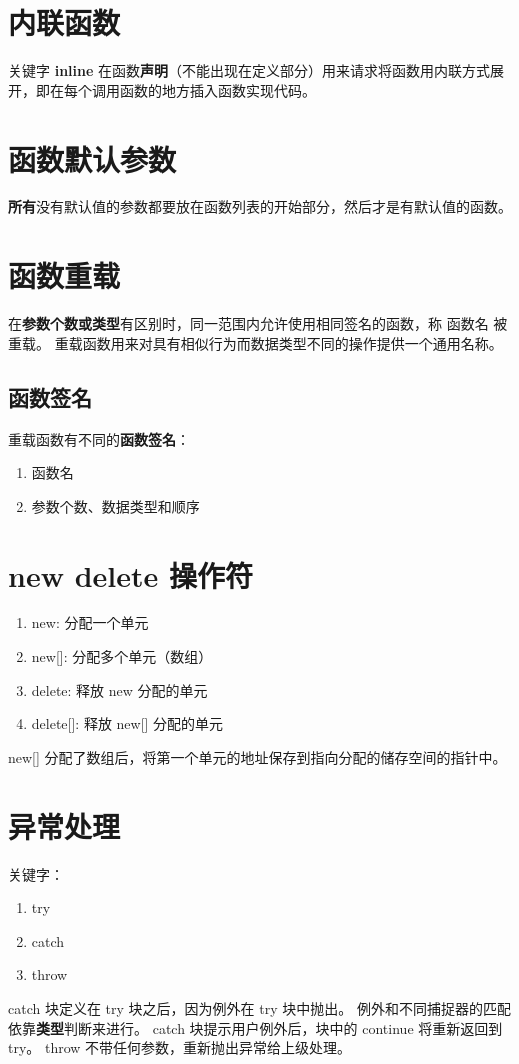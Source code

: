 \section{内联函数}

关键字 \textbf{inline} 在函数\textbf{声明}（不能出现在定义部分）用来请求将函数用内联方式展开，即在每个调用函数的地方插入函数实现代码。

\section{函数默认参数}

\textbf{所有}没有默认值的参数都要放在函数列表的开始部分，然后才是有默认值的函数。

\section{函数重载}

在\textbf{参数个数或类型}有区别时，同一范围内允许使用相同签名的函数，称 函数名 被重载。
重载函数用来对具有相似行为而数据类型不同的操作提供一个通用名称。

\subsection{函数签名}

重载函数有不同的\textbf{函数签名}：

\begin{enumerate}
    \item 函数名
    \item 参数个数、数据类型和顺序
\end{enumerate}

\section{new delete 操作符}

\begin{enumerate}
    \item new: 分配一个单元
    \item new[]: 分配多个单元（数组）
    \item delete: 释放 new 分配的单元
    \item delete[]: 释放 new[] 分配的单元
\end{enumerate}

new[] 分配了数组后，将第一个单元的地址保存到指向分配的储存空间的指针中。

\section{异常处理}

关键字：
\begin{enumerate}
    \item try
    \item catch
    \item throw
\end{enumerate}

catch 块定义在 try 块之后，因为例外在 try 块中抛出。
例外和不同捕捉器的匹配依靠\textbf{类型}判断来进行。
catch 块提示用户例外后，块中的 continue 将重新返回到 try。
throw 不带任何参数，重新抛出异常给上级处理。

\newpage